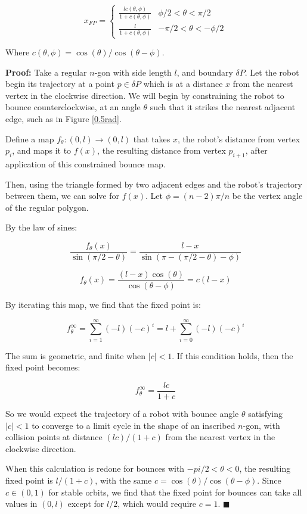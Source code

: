 \documentclass[letterpaper, 10 pt, conference]{ieeeconf}  %
\begin{document}
$$ x_{FP} = 
\begin{cases}
        \frac{l c(\theta, \phi)}{1 + c(\theta, \phi)} & \phi/2 < \theta
< \pi/2 \\
        \frac{l}{1+c(\theta, \phi)} & -\pi/2 < \theta
< -\phi/2
\end{cases}
$$

Where $c(\theta, \phi) = \cos(\theta)/\cos(\theta-\phi)$.

\textbf{Proof:} Take a regular
$n$-gon with side length $l$, and boundary $\delta P$. Let the robot begin its trajectory
at a point $p \in \delta P$ which
is at a distance $x$ from the nearest vertex in the clockwise direction.
We will begin by constraining the robot to bounce counterclockwise, at an angle
 $\theta$ such that it strikes the nearest adjacent edge, such as in Figure
\ref{0.5rad}.

Define a map $f_{\theta}: (0,l) \to (0,l)$ that takes $x$, the robot's distance from
 vertex $p_i$, and maps it to $f(x)$, the resulting distance from vertex $p_{i+
 1}$, after application of this constrained bounce map.

Then, using the triangle formed by two adjacent edges and the robot's trajectory
between them, we can solve for $f(x)$. Let $\phi=(n-2) \pi / n$ be the vertex angle of the
regular polygon.

By the law of sines:

$$ \frac{f_{\theta}(x)}{\sin (\pi/2-\theta)} = \frac{l-x}{\sin
(\pi-(\pi/2-\theta)-\phi)} $$

$$ f_{\theta}(x) = \frac{(l-x) \cos (\theta)}{\cos
(\theta-\phi)} = c (l-x) $$

By iterating this map, we find that the fixed point is:

$$ f_{\theta}^{\infty} = \sum_{i=1}^{\infty} (-l) (-c)^i = l+ \sum_{i=0}^{\infty}
(-l)(-c)^i $$

The sum is geometric, and finite when $|c| < 1$. If this condition holds, then
the fixed point becomes:

$$ f_{\theta}^{\infty} = \frac{lc}{1+c} $$

So we would expect the trajectory of a robot with bounce angle $\theta$ satisfying
$|c| < 1$ to converge to a limit cycle in the shape of an inscribed $n$-gon,
with collision points at distance $(lc)/(1+c)$ from the nearest vertex in the
clockwise direction. 

When this calculation is redone for bounces with $-pi/2 < \theta < 0$, the
resulting fixed point is $l/(1+c)$, with the same
$c=\cos(\theta)/\cos(\theta-\phi)$. Since $c \in (0,1)$ for stable orbits, we
find that the fixed point for bounces can take all values in $(0,l)$ except for
$l/2$, which would require $c=1$. \hfill $\blacksquare$
\end{document}
